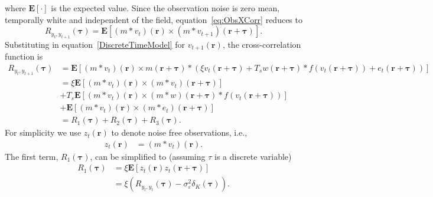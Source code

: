 \documentclass[]{article}
\begin{document}
where $\mathbf{E}[\cdot]$ is the expected value. Since the observation noise is zero mean, temporally white and independent of the field, equation~\ref{eq:ObsXCorr} reduces to
\begin{equation}
	R_{y_{t},y_{t+1}}(\boldsymbol{\tau}) = \mathbf{E}\left[ \left(m \ast v_t\right)\left(\mathbf{r}\right) \times \left(m \ast v_{t+1}\right)\left(\mathbf{r}+\boldsymbol{\tau}\right)\right].
\end{equation}
Substituting in equation~\ref{DiscreteTimeModel}  for $v_{t+1}\left(\mathbf{r}\right)$, the cross-correlation function is
\begin{align}
	R_{y_{t},y_{t+1}}(\boldsymbol{\tau}) &= \mathbf{E}\left[ \left(m \ast v_t \right)\left(\mathbf{r}\right) \times m\left(\mathbf{r}+\boldsymbol{\tau}\right) \ast \left( \xi v_t\left(\mathbf{r}+\boldsymbol{\tau}\right) + T_s w\left(\mathbf{r}+\boldsymbol{\tau}\right) \ast f\left(v_t\left(\mathbf{r}+\boldsymbol{\tau}\right)\right) + e_t\left(\mathbf{r}+\boldsymbol{\tau}\right)\right) \right] \nonumber \\	
	 &= \xi \mathbf{E}\left[ \left(m \ast v_t \right)\left(\mathbf{r}\right) \times \left(m \ast v_t\right)\left(\mathbf{r}+\boldsymbol{\tau}\right)\right] \nonumber \\
	&+ T_s\mathbf{E}\left[\left(m \ast v_t \right)\left(\mathbf{r}\right) \times \left(m \ast w \right)\left(\mathbf{r}+\boldsymbol{\tau}\right) \ast f\left(v_t\left(\mathbf{r}+\boldsymbol{\tau}\right)\right) \right] \nonumber \\
	&+ \mathbf{E}\left[ \left(m \ast v_t \right)\left(\mathbf{r}\right)  \times \left(m \ast e_t\right)\left(\mathbf{r}+\boldsymbol{\tau}\right)\right] \nonumber \\
	&= R_1(\boldsymbol{\tau}) + R_2(\boldsymbol{\tau}) + R_3(\boldsymbol{\tau}).\label{eq:spatialxcorr} 
\end{align}
For simplicity we use $z_{t}\left(\mathbf{r}\right)$ to denote noise free observations, i.e.,
\begin{align}
z_{t}\left(\mathbf r\right)&=\left(m\ast v_{t}\right)\left(\mathbf{r}\right). 
\end{align}
The first term, $R_1(\boldsymbol{\tau})$, can be simplified to (assuming $\tau$ is a discrete variable)
\begin{align}
	R_1(\boldsymbol{\tau}) &= \xi \mathbf{E}\left[z_{t}\left(\mathbf r\right)  z_{t}\left(\mathbf{r}+\boldsymbol{\tau}\right) \right] \\
	&= \xi\left( R_{y_{t},y_{t}}(\boldsymbol{\tau}) - \sigma_{\varepsilon}^2\delta_K\left(\boldsymbol{\tau}\right) \right). \label{eq:R1}
\end{align}
\end{document}
